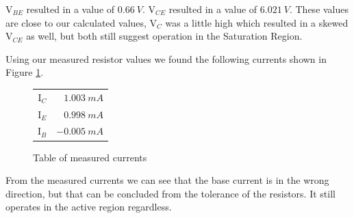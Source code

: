 \documentclass{article}
\begin{document}
V$_{BE}$ resulted in a value of $\SI{0.66}{V}$.
V$_{CE}$ resulted in a value of $\SI{6.021}{V}$.
These values are close to our calculated values,
V$_C$ was a little high which resulted in a skewed
V$_{CE}$ as well, but both still suggest operation in
the Saturation Region.

Using our measured resistor values we found 
the following currents shown in Figure
\ref{table:satTableMeasCurrent}.

\begin{figure}[h!]
  \begin{center}
    \begin{tabular}{r|r}
      I$_C$ & $\SI{1.003}{mA}$ \\
      I$_E$ & $\SI{0.998}{mA}$ \\
      I$_B$ & $\SI{-0.005}{mA}$ \\

    \end{tabular}
  \end{center}
  \caption{Table of measured currents}
  \label{table:satTableMeasCurrent}
\end{figure}

From the measured currents we can see that the base
current is in the wrong direction, but that can
be concluded from the tolerance of the resistors. It
still operates in the active region regardless.
\end{document}
